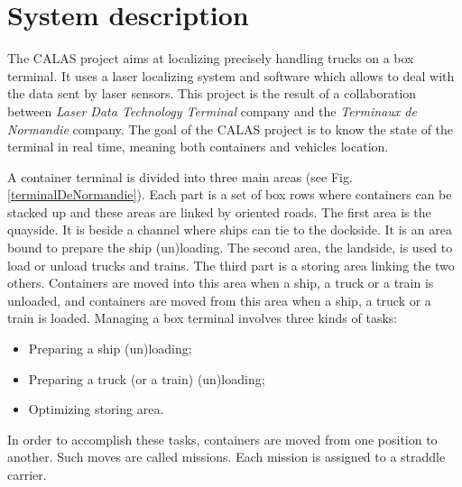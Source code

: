 \documentclass[journal]{IEEEtran}
\begin{document}
\section{System description}


The CALAS project aims at localizing precisely handling trucks on a box
terminal. It uses a laser localizing system and software which allows to deal
with the data sent by laser sensors. This project is the result of a collaboration
between \textit{Laser Data Technology Terminal} company and the
\textit{Terminaux de Normandie} company. The goal of the CALAS project is to
know the state of the terminal in real time, meaning both containers and
vehicles location.


A container terminal is divided into three main areas (see Fig. \ref{terminalDeNormandie}). Each part is a set of
box rows where containers can be stacked up and these areas are linked by
oriented roads. The first area is the quayside. It is beside a channel where
ships can tie to the dockside. It is an area bound to prepare the ship
(un)loading. The second area, the landside, is used to load or unload trucks
and trains. The third part is a storing area linking the two others. Containers
are moved into this area when a ship, a truck or a train is unloaded, and
containers are moved from this area when a ship, a truck or a train is loaded.
Managing a box terminal involves three kinds of tasks:

\begin{itemize}
	\item Preparing a ship (un)loading;
	\item Preparing a truck (or a train) (un)loading;
	\item Optimizing storing area.
\end{itemize}

In order to accomplish these tasks, containers are moved from one
position to another. Such moves are called missions. Each mission is
assigned to a straddle carrier.
\end{document}
